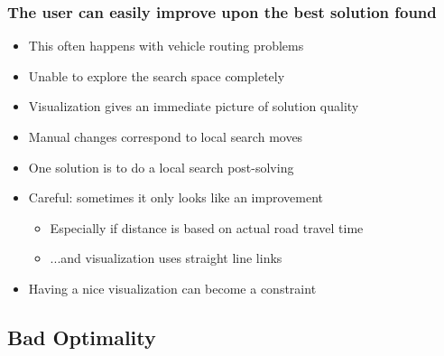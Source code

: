 \begin{frame}
\frametitle{The user can easily improve upon the best solution found}
\begin{itemize}
\item This often happens with vehicle routing problems
\item Unable to explore the search space completely
\item Visualization gives an immediate picture of solution quality
  \item Manual changes correspond to local search moves
  \item One solution is to do a local search post-solving
  \item Careful: sometimes it only looks like an improvement
  \begin{itemize}
      \item Especially if distance is based on actual road travel time
      \item ...and visualization uses straight line links
  \end{itemize}
  \item Having a nice visualization can become a constraint
\end{itemize}
\end{frame}

\subsection*{Bad Optimality}

